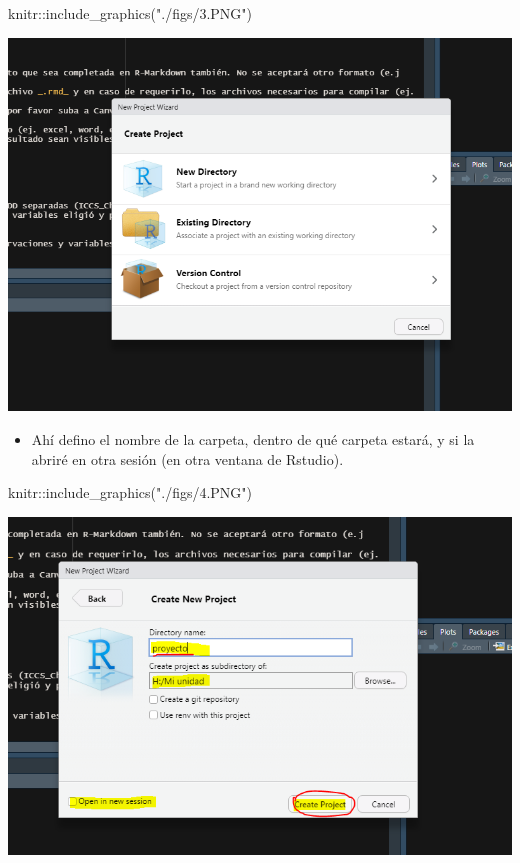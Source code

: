 \documentclass[
]{article}
\newenvironment{Shaded}{}{}
\newcommand{\FunctionTok}[1]{\textcolor[rgb]{0.02,0.16,0.49}{#1}}
\newcommand{\NormalTok}[1]{#1}
\newcommand{\SpecialCharTok}[1]{\textcolor[rgb]{0.25,0.44,0.63}{#1}}
\newcommand{\StringTok}[1]{\textcolor[rgb]{0.25,0.44,0.63}{#1}}
\providecommand{\tightlist}{%
  \setlength{\itemsep}{0pt}\setlength{\parskip}{0pt}}
\begin{document}
\begin{Shaded}
\begin{Highlighting}[]
\NormalTok{knitr}\SpecialCharTok{::}\FunctionTok{include\_graphics}\NormalTok{(}\StringTok{"./figs/3.PNG"}\NormalTok{)}
\end{Highlighting}
\end{Shaded}

\begin{center}\includegraphics[width=0.6\linewidth]{./figs/3} \end{center}

\begin{itemize}
\tightlist
\item
  Ahí defino el nombre de la carpeta, dentro de qué carpeta estará, y si
  la abriré en otra sesión (en otra ventana de Rstudio).
\end{itemize}

\begin{Shaded}
\begin{Highlighting}[]
\NormalTok{knitr}\SpecialCharTok{::}\FunctionTok{include\_graphics}\NormalTok{(}\StringTok{"./figs/4.PNG"}\NormalTok{)}
\end{Highlighting}
\end{Shaded}

\begin{center}\includegraphics[width=0.6\linewidth]{./figs/4} \end{center}
\end{document}
